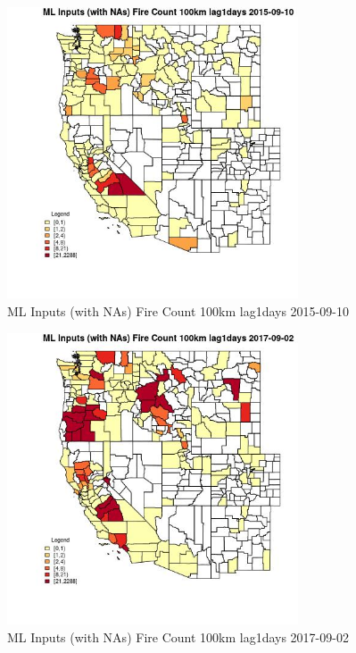 \begin{figure} 
\centering  
\includegraphics[width=0.77\textwidth]{Code_Outputs/Report_ML_input_PM25_Step4_part_e_de_duplicated_aves_compiled_2019-05-21wNAs_CountyFire_Count_100km_lag1daysMean2015-09-10.jpg} 
\caption{\label{fig:Report_ML_input_PM25_Step4_part_e_de_duplicated_aves_compiled_2019-05-21wNAsCountyFire_Count_100km_lag1daysMean2015-09-10}ML Inputs (with NAs) Fire Count 100km lag1days 2015-09-10} 
\end{figure} 
 

\begin{figure} 
\centering  
\includegraphics[width=0.77\textwidth]{Code_Outputs/Report_ML_input_PM25_Step4_part_e_de_duplicated_aves_compiled_2019-05-21wNAs_CountyFire_Count_100km_lag1daysMean2017-09-02.jpg} 
\caption{\label{fig:Report_ML_input_PM25_Step4_part_e_de_duplicated_aves_compiled_2019-05-21wNAsCountyFire_Count_100km_lag1daysMean2017-09-02}ML Inputs (with NAs) Fire Count 100km lag1days 2017-09-02} 
\end{figure} 
 

